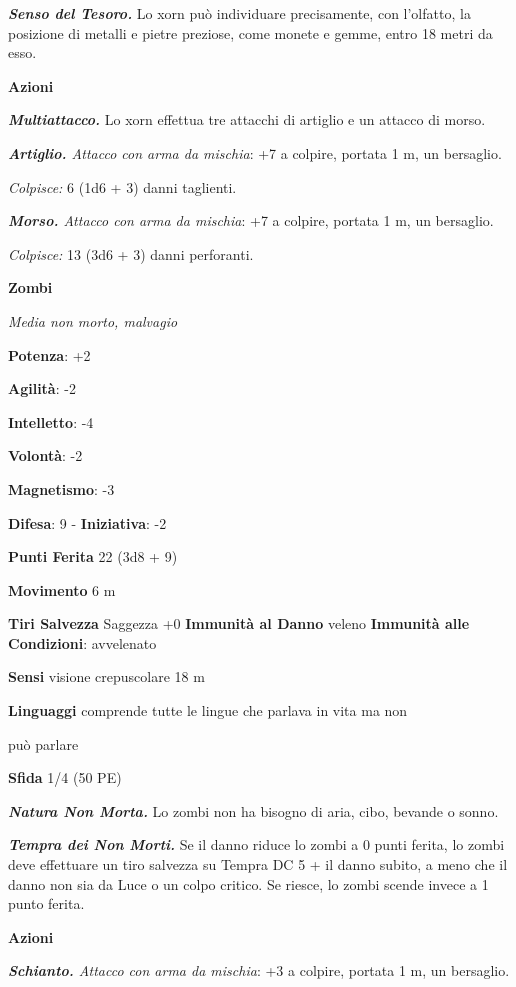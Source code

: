 \begin{multicols}{2}
\emph{\textbf{Senso del Tesoro.}} Lo xorn può individuare precisamente,
con l'olfatto, la posizione di metalli e pietre preziose, come monete e
gemme, entro 18 metri da esso.

\smallskip\textbf{Azioni}

\emph{\textbf{Multiattacco.}} Lo xorn effettua tre attacchi di artiglio
e un attacco di morso.

\emph{\textbf{Artiglio.} Attacco con arma da mischia}: +7 a colpire,
portata 1 m, un bersaglio.

\emph{Colpisce:} 6 (1d6 + 3) danni taglienti.

\emph{\textbf{Morso.} Attacco con arma da mischia}: +7 a colpire,
portata 1 m, un bersaglio.

\emph{Colpisce:} 13 (3d6 + 3) danni perforanti.

\textbf{Zombi}

\emph{Media non morto, malvagio}

\textbf{Potenza}: +2

\textbf{Agilità}: -2

\textbf{Intelletto}: -4

\textbf{Volontà}: -2

\textbf{Magnetismo}: -3

\textbf{Difesa}: 9 - \textbf{Iniziativa}: -2

\textbf{Punti Ferita} 22 (3d8 + 9)

\textbf{Movimento} 6 m

\textbf{Tiri Salvezza} Saggezza +0 \textbf{Immunità al Danno} veleno
\textbf{Immunità alle Condizioni}: avvelenato

\textbf{Sensi} visione crepuscolare 18 m

\textbf{Linguaggi} comprende tutte le lingue che parlava in vita ma non

può parlare

\textbf{Sfida} 1/4 (50 PE)\smallskip

\emph{\textbf{Natura Non Morta.}} Lo zombi non ha bisogno di aria, cibo,
bevande o sonno.

\emph{\textbf{Tempra dei Non Morti.}} Se il danno riduce lo zombi a 0
punti ferita, lo zombi deve effettuare un tiro salvezza su Tempra
DC 5 + il danno subito, a meno che il danno non sia da Luce o un colpo
critico. Se riesce, lo zombi scende invece a 1 punto ferita.

\smallskip\textbf{Azioni}

\emph{\textbf{Schianto.} Attacco con arma da mischia}: +3 a colpire,
portata 1 m, un bersaglio.


\end{multicols}

